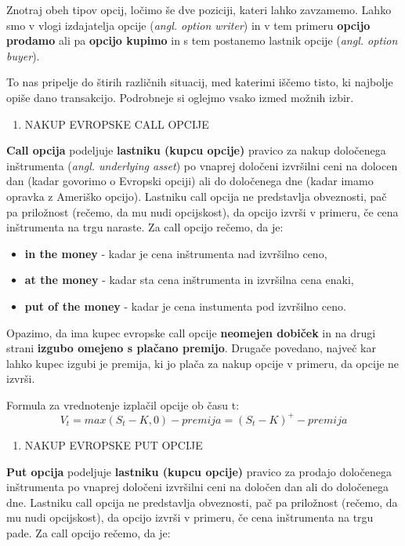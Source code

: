 \documentclass[
]{article}
\providecommand{\tightlist}{%
  \setlength{\itemsep}{0pt}\setlength{\parskip}{0pt}}
\begin{document}
Znotraj obeh tipov opcij, ločimo še dve poziciji, kateri lahko
zavzamemo. Lahko smo v vlogi izdajatelja opcije (\emph{angl. option
writer}) in v tem primeru \textbf{opcijo prodamo} ali pa \textbf{opcijo
kupimo} in s tem postanemo lastnik opcije (\emph{angl. option buyer}).

To nas pripelje do štirih različnih situacij, med katerimi iščemo tisto,
ki najbolje opiše dano transakcijo. Podrobneje si oglejmo vsako izmed
možnih izbir.

\begin{enumerate}
\def\labelenumi{\arabic{enumi}.}
\tightlist
\item
  NAKUP EVROPSKE CALL OPCIJE
\end{enumerate}

\textbf{Call opcija} podeljuje \textbf{lastniku (kupcu opcije)} pravico
za nakup določenega inštrumenta (\emph{angl. underlying asset}) po
vnaprej določeni izvršilni ceni na dolocen dan (kadar govorimo o
Evropski opciji) ali do določenega dne (kadar imamo opravka z Ameriško
opcijo). Lastniku call opcija ne predstavlja obveznosti, pač pa
priložnost (rečemo, da mu nudi opcijskost), da opcijo izvrši v primeru,
če cena inštrumenta na trgu naraste. Za call opcijo rečemo, da je:

\begin{itemize}
\tightlist
\item
  \textbf{in the money} - kadar je cena inštrumenta nad izvršilno ceno,
\item
  \textbf{at the money} - kadar sta cena inštrumenta in izvršilna cena
  enaki,
\item
  \textbf{put of the money} - kadar je cena instumenta pod izvršilno
  ceno.
\end{itemize}

Opazimo, da ima kupec evropske call opcije \textbf{neomejen dobiček} in
na drugi strani \textbf{izgubo omejeno s plačano premijo}. Drugače
povedano, največ kar lahko kupec izgubi je premija, ki jo plača za nakup
opcije v primeru, da opcije ne izvrši.

Formula za vrednotenje izplačil opcije ob času t:
\[ V_t = max(S_t-K,0) - premija = (S_t - K)^+ - premija\]

\begin{enumerate}
\def\labelenumi{\arabic{enumi}.}
\setcounter{enumi}{1}
\tightlist
\item
  NAKUP EVROPSKE PUT OPCIJE
\end{enumerate}

\textbf{Put opcija} podeljuje \textbf{lastniku (kupcu opcije) } pravico
za prodajo določenega inštrumenta po vnaprej določeni izvršilni ceni na
določen dan ali do določenega dne. Lastniku call opcija ne predstavlja
obveznosti, pač pa priložnost (rečemo, da mu nudi opcijskost), da opcijo
izvrši v primeru, če cena inštrumenta na trgu pade. Za call opcijo
rečemo, da je:
\end{document}
